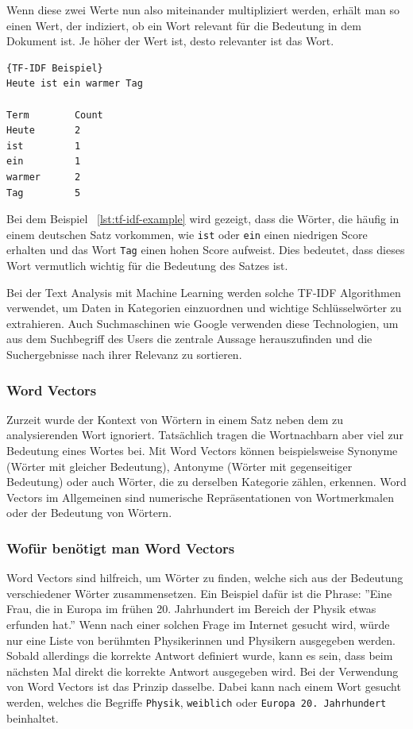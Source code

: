 Wenn diese zwei Werte nun also miteinander multipliziert werden, erhält man so einen Wert, der indiziert, ob ein Wort relevant für die Bedeutung in dem Dokument ist.
Je höher der Wert ist, desto relevanter ist das Wort.

\begin{lstlisting}[label={lst:tf-idf-example},caption={TF-IDF Beispiel}]{TF-IDF Beispiel}
Heute ist ein warmer Tag

Term        Count
Heute       2
ist         1
ein         1
warmer      2
Tag         5
\end{lstlisting}

Bei dem Beispiel ~\ref{lst:tf-idf-example} wird gezeigt, dass die Wörter, die häufig in einem deutschen Satz vorkommen, wie \texttt{ist} oder \texttt{ein} einen niedrigen Score erhalten und das Wort \texttt{Tag} einen hohen Score aufweist.
Dies bedeutet, dass dieses Wort vermutlich wichtig für die Bedeutung des Satzes ist.

Bei der Text Analysis mit Machine Learning werden solche TF-IDF Algorithmen verwendet, um Daten in Kategorien einzuordnen und wichtige Schlüsselwörter zu extrahieren.
Auch Suchmaschinen wie Google verwenden diese Technologien, um aus dem Suchbegriff des Users die zentrale Aussage herauszufinden und die Suchergebnisse nach ihrer Relevanz zu sortieren.\cite{tfIdf}

\subsubsection{Word Vectors}\label{subsubsec:word-vectors}

Zurzeit wurde der Kontext von Wörtern in einem Satz neben dem zu analysierenden Wort ignoriert.
Tatsächlich tragen die Wortnachbarn aber viel zur Bedeutung eines Wortes bei.
Mit Word Vectors können beispielsweise Synonyme (Wörter mit gleicher Bedeutung), Antonyme (Wörter mit gegenseitiger Bedeutung) oder auch Wörter, die zu derselben Kategorie zählen, erkennen.
Word Vectors im Allgemeinen sind numerische Repräsentationen von Wortmerkmalen oder der Bedeutung von Wörtern.

\subsubsection{Wofür benötigt man Word Vectors}\label{subsubsec:why-word-vectors}

Word Vectors sind hilfreich, um Wörter zu finden, welche sich aus der Bedeutung verschiedener Wörter zusammensetzen.
Ein Beispiel dafür ist die Phrase: ''Eine Frau, die in Europa im frühen 20. Jahrhundert im Bereich der Physik etwas erfunden hat.''
Wenn nach einer solchen Frage im Internet gesucht wird, würde nur eine Liste von berühmten Physikerinnen und Physikern ausgegeben werden.
Sobald allerdings die korrekte Antwort definiert wurde, kann es sein, dass beim nächsten Mal direkt die korrekte Antwort ausgegeben wird.
Bei der Verwendung von Word Vectors ist das Prinzip dasselbe.
Dabei kann nach einem Wort gesucht werden, welches die Begriffe \texttt{Physik}, \texttt{weiblich} oder \texttt{Europa 20. Jahrhundert} beinhaltet.\cite{nlpInAction}

